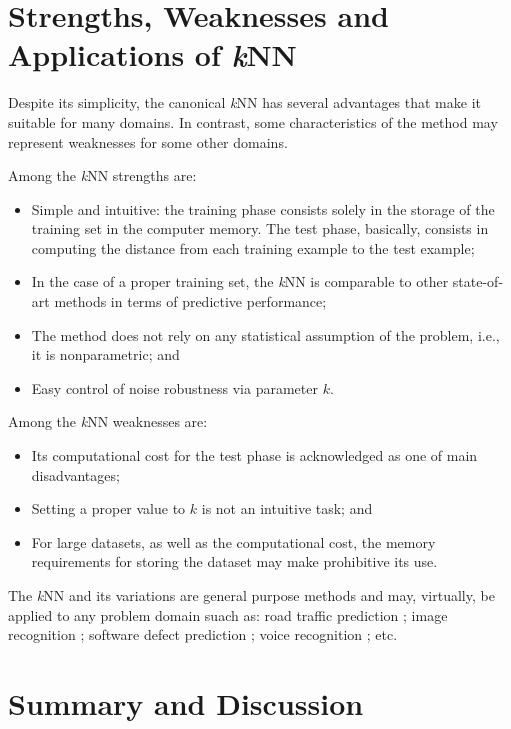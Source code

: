 \section{Strengths, Weaknesses and Applications of \textit{k}NN}

Despite its simplicity, the canonical \textit{k}NN has several advantages that make it suitable for many domains. In contrast, some characteristics of the method may represent weaknesses for some other domains. 
\vspace{0.2cm}

\noindent Among the \textit{k}NN strengths are:

\begin{itemize}
    \item Simple and intuitive: the training phase consists solely in the storage of the training set in the computer memory. The test phase, basically, consists in computing the distance from each training example to the test example;
    \item In the case of a proper training set, the \textit{k}NN is comparable to other state-of-art methods in terms of predictive performance;
    \item The method does not rely on any statistical assumption of the problem, i.e., it is nonparametric; and
    \item Easy control of noise robustness via parameter $k$.
\end{itemize}

\noindent Among the \textit{k}NN weaknesses are:


\begin{itemize}
    \item Its computational cost for the test phase is acknowledged as one of main disadvantages;  
    \item Setting a proper value to $k$ is not an intuitive task; and
    \item For large datasets, as well as the computational cost, the memory requirements for storing the dataset may make prohibitive its use. 
    
\end{itemize}

The \textit{k}NN and its variations are general purpose methods and may, virtually, be applied to any problem domain suach as: road traffic prediction \cite{XU2020104}; image recognition \cite{CHEN201878}; software defect prediction \cite{GOYAL201415}; voice recognition \cite{CHEN2021932.e1}; etc.

\section{Summary and Discussion}


